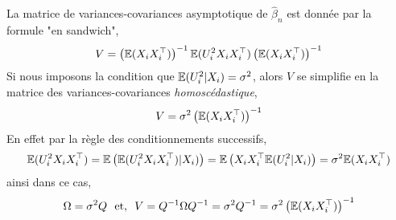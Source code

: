 \documentclass[12pt, reqno]{amsart}
\begin{document}
\begin{remarque}\label{re2}
La matrice de variances-covariances asymptotique de $\widehat{\beta}_n$ est donnée par la formule "en sandwich",
\begin{align*}
V = \left(\mathbb{E}(X_iX_i^\top)\right)^{-1} \mathbb{E}(U_i^2X_iX_i^\top) \left(\mathbb{E}(X_iX_i^\top)\right)^{-1}
\end{align*}
Si nous imposons la condition que $\mathbb{E}(U_i^2|X_i) = \sigma^2$, alors $V$ se simplifie en la matrice des variances-covariances \emph{homoscédastique},
\begin{align}
V = \sigma^2\left(\mathbb{E}(X_iX_i^\top)\right)^{-1}
\label{eq4}
\end{align}
En effet par la règle des conditionnements successifs,
\begin{align*}
\mathbb{E}(U_i^2X_iX_i^\top) = \mathbb{E}\left(\mathbb{E}(U_i^2X_iX_i^\top) | X_i) \right) = \mathbb{E}\left(X_iX_i^\top\mathbb{E}(U_i^2|X_i)\right) = \sigma^2\mathbb{E}(X_iX_i^\top)
\end{align*}
ainsi dans ce cas, 
\begin{align*}
\Omega = \sigma^2 Q \ \ \textrm{et,} \ \ V = Q^{-1}\Omega  Q^{-1} = \sigma^2  Q^{-1} =\sigma^2\left(\mathbb{E}(X_iX_i^\top)\right)^{-1}
\end{align*}
\end{remarque}
\end{document}
